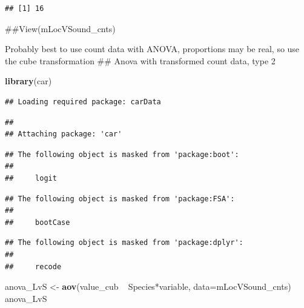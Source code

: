 \documentclass[]{article}
\newenvironment{Shaded}{\begin{snugshade}}{\end{snugshade}}
\newcommand{\KeywordTok}[1]{\textcolor[rgb]{0.13,0.29,0.53}{\textbf{{#1}}}}
\newcommand{\DataTypeTok}[1]{\textcolor[rgb]{0.13,0.29,0.53}{{#1}}}
\newcommand{\DecValTok}[1]{\textcolor[rgb]{0.00,0.00,0.81}{{#1}}}
\newcommand{\StringTok}[1]{\textcolor[rgb]{0.31,0.60,0.02}{{#1}}}
\newcommand{\NormalTok}[1]{{#1}}
\begin{document}
\begin{Shaded}
\end{Shaded}

\begin{verbatim}
## [1] 16
\end{verbatim}

\begin{Shaded}
\begin{Highlighting}[]
\NormalTok{##View(mLocVSound_cnts)}
\end{Highlighting}
\end{Shaded}

Probably best to use count data with ANOVA, proportions may be real, so
use the cube transformation \#\# Anova with transformed count data, type
2

\begin{Shaded}
\begin{Highlighting}[]
\KeywordTok{library}\NormalTok{(car)}
\end{Highlighting}
\end{Shaded}

\begin{verbatim}
## Loading required package: carData
\end{verbatim}

\begin{verbatim}
## 
## Attaching package: 'car'
\end{verbatim}

\begin{verbatim}
## The following object is masked from 'package:boot':
## 
##     logit
\end{verbatim}

\begin{verbatim}
## The following object is masked from 'package:FSA':
## 
##     bootCase
\end{verbatim}

\begin{verbatim}
## The following object is masked from 'package:dplyr':
## 
##     recode
\end{verbatim}

\begin{Shaded}
\begin{Highlighting}[]
\NormalTok{anova_LvS <-}\StringTok{ }\KeywordTok{aov}\NormalTok{(value_cub ~}\StringTok{ }\NormalTok{Species*variable, }\DataTypeTok{data=}\NormalTok{mLocVSound_cnts)}
\NormalTok{anova_LvS}
\end{Highlighting}
\end{Shaded}
\end{document}
